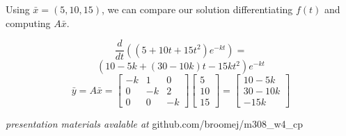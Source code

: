 \documentclass[12pt]{article}
\begin{document}
\newpage

Using $\bar{x} = (5, 10, 15)$, we can compare our solution differentiating $f(t)$ and computing $A\bar{x}$.

\[
  \frac{d}{dt}((5+10t+15t^2)e^{-kt}) = 
\]
\[
  (10-5k + (30-10k)t -15kt^2)e^{-kt}
\]
\medbreak{}
\[
  \bar{y} = A\bar{x} = 
  \begin{bmatrix}
    -k & 1 & 0 \\
    0 & -k & 2 \\
    0 & 0 & -k
  \end{bmatrix}
  \begin{bmatrix} 5 \\ 10 \\ 15 \end{bmatrix} = 
  \begin{bmatrix} 10-5k \\ 30-10k \\ -15k \end{bmatrix}
\]
\bigbreak{}
\bigbreak{}
\bigbreak{}
\bigbreak{}
\bigbreak{}
\bigbreak{}
\bigbreak{}
\bigbreak{}
\bigbreak{}
\bigbreak{}
\bigbreak{}
\bigbreak{}

\textit{presentation materials avalable at} github.com/broomej/m308\_w4\_cp
\end{document}
